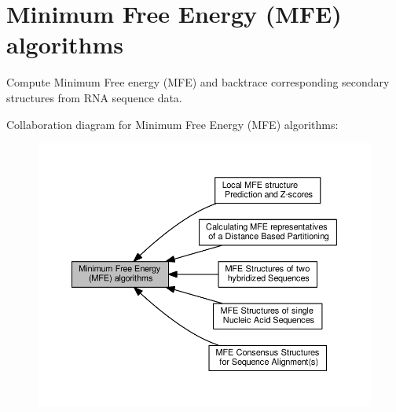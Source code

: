\hypertarget{group__mfe__fold}{}\section{Minimum Free Energy (M\+FE) algorithms}
\label{group__mfe__fold}


Compute Minimum Free energy (M\+FE) and backtrace corresponding secondary structures from R\+NA sequence data.  


Collaboration diagram for Minimum Free Energy (M\+FE) algorithms\+:
\nopagebreak
\begin{figure}[H]
\begin{center}
\leavevmode
\includegraphics[width=350pt]{group__mfe__fold}
\end{center}
\end{figure}
